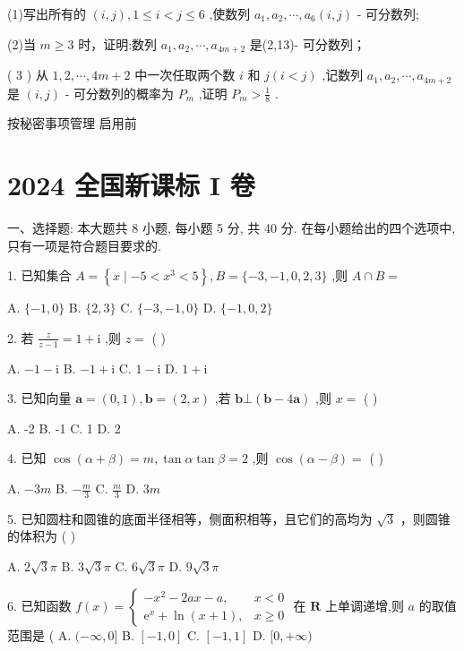 \documentclass[10pt]{article}
\begin{document}
(1)写出所有的 \(\left( {i,j}\right) ,1 \leq  i < j \leq  6\) ,使数列 \({a}_{1},{a}_{2},\cdots ,{a}_{6}\left( {i,j}\right)\) - 可分数列;

(2)当 \(m \geq  3\) 时，证明:数列 \({a}_{1},{a}_{2},\cdots ,{a}_{{4m} + 2}\) 是(2,13)- 可分数列；

( 3 ) 从 \(1,2,\cdots ,{4m} + 2\) 中一次任取两个数 \(i\) 和 \(j\left( {i < j}\right)\) ,记数列 \({a}_{1},{a}_{2},\cdots ,{a}_{{4m} + 2}\) 是 \(\left( {i,j}\right)\) - 可分数列的概率为 \({P}_{m}\) ,证明 \({P}_{m} > \frac{1}{8}\) .

按秘密事项管理  启用前

\section*{2024 全国新课标 I 卷}

一、选择题: 本大题共 8 小题, 每小题 5 分, 共 40 分. 在每小题给出的四个选项中, 只有一项是符合题目要求的.

1. 已知集合 \(A = \left\{  {x \mid   - 5 < {x}^{3} < 5}\right\}  ,B = \{  - 3, - 1,0,2,3\}\) ,则 \(A \cap  B =\)

A. \(\{  - 1,0\}\) B. \(\{ 2,3\}\) C. \(\{  - 3, - 1,0\}\) D. \(\{  - 1,0,2\}\)

2. 若 \(\frac{z}{z - 1} = 1 + \mathrm{i}\) ,则 \(z =\) ( )

A. \(- 1 - \mathrm{i}\) B. \(- 1 + \mathrm{i}\) C. \(1 - \mathrm{i}\) D. \(1 + \mathrm{i}\)

3. 已知向量 \(\mathbf{a} = \left( {0,1}\right) ,\mathbf{b} = \left( {2,x}\right)\) ,若 \(\mathbf{b} \bot  \left( {\mathbf{b} - 4\mathbf{a}}\right)\) ,则 \(x =\) ( )

A. -2 B. -1 C. 1 D. 2

4. 已知 \(\cos \left( {\alpha  + \beta }\right)  = m,\tan \alpha \tan \beta  = 2\) ,则 \(\cos \left( {\alpha  - \beta }\right)  =\) ( )

A. \(- {3m}\) B. \(- \frac{m}{3}\) C. \(\frac{m}{3}\) D. \({3m}\)

5. 已知圆柱和圆锥的底面半径相等，侧面积相等，且它们的高均为 \(\sqrt{3}\) ，则圆锥的体积为 ( )

A. \(2\sqrt{3}\pi\) B. \(3\sqrt{3}\pi\) C. \(6\sqrt{3}\pi\) D. \(9\sqrt{3}\pi\)

6. 已知函数 \(f\left( x\right)  = \left\{  \begin{array}{ll}  - {x}^{2} - {2ax} - a, & x < 0 \\  {\mathrm{e}}^{x} + \ln \left( {x + 1}\right) , & x \geq  0 \end{array}\right.\) 在 \(\mathbf{R}\) 上单调递增,则 \(a\) 的取值范围是 ( A. \(( - \infty ,0\rbrack\) B. \(\left\lbrack  {-1,0}\right\rbrack\) C. \(\left\lbrack  {-1,1}\right\rbrack\) D. \(\lbrack 0, + \infty )\)
\end{document}
